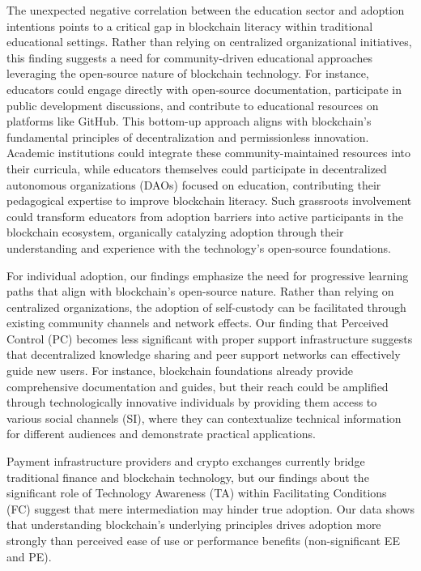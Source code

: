 \documentclass[twocolumn]{article}
\begin{document}
The unexpected negative correlation between the education sector and adoption intentions points to a critical gap in blockchain literacy within traditional educational settings. Rather than relying on centralized organizational initiatives, this finding suggests a need for community-driven educational approaches leveraging the open-source nature of blockchain technology. For instance, educators could engage directly with open-source documentation, participate in public development discussions, and contribute to educational resources on platforms like GitHub. This bottom-up approach aligns with blockchain's fundamental principles of decentralization and permissionless innovation. Academic institutions could integrate these community-maintained resources into their curricula, while educators themselves could participate in decentralized autonomous organizations (DAOs) focused on education, contributing their pedagogical expertise to improve blockchain literacy. Such grassroots involvement could transform educators from adoption barriers into active participants in the blockchain ecosystem, organically catalyzing adoption through their understanding and experience with the technology's open-source foundations.

For individual adoption, our findings emphasize the need for progressive learning paths that align with blockchain's open-source nature. Rather than relying on centralized organizations, the adoption of self-custody can be facilitated through existing community channels and network effects. Our finding that Perceived Control (PC) becomes less significant with proper support infrastructure suggests that decentralized knowledge sharing and peer support networks can effectively guide new users. For instance, blockchain foundations already provide comprehensive documentation and guides, but their reach could be amplified through technologically innovative individuals by providing them access to various social channels (SI), where they can contextualize technical information for different audiences and demonstrate practical applications.

Payment infrastructure providers and crypto exchanges currently bridge traditional finance and blockchain technology, but our findings about the significant role of Technology Awareness (TA) within Facilitating Conditions (FC) suggest that mere intermediation may hinder true adoption. Our data shows that understanding blockchain's underlying principles drives adoption more strongly than perceived ease of use or performance benefits (non-significant EE and PE).
\end{document}

